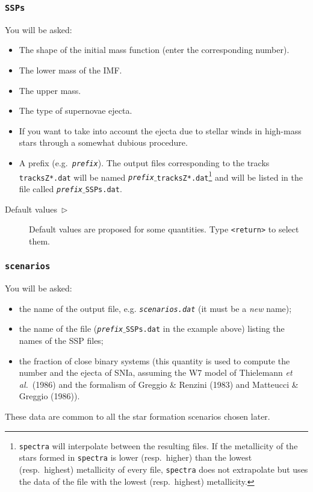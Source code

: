 \documentclass[11pt,draft,fleqn]{article}
\begin{document}
\subsubsection{\texttt{SSPs}}
You will be asked: 
\begin{itemize}
\item The shape of the initial mass function (enter the corresponding number).
\item The lower mass of the IMF.
\item The upper mass.
\item The type of supernovae ejecta.
\item If you want to take into account the ejecta due to stellar winds
in high-mass stars through a somewhat dubious procedure.
\item A prefix (e.g.\ \texttt{\emph{prefix}}). The output files corresponding
to the tracks \texttt{tracksZ*.dat} will be named 
\texttt{\emph{prefix}$\_$tracksZ*.dat}\footnote{\texttt{spectra} will 
interpolate between the 
resulting files. If the metallicity of the stars formed in \texttt{spectra} is 
lower (resp.\ higher) than the lowest (resp.\ highest) metallicity of every
file, \texttt{spectra} does not extrapolate but uses the data
of the file with the lowest (resp.\ highest) metallicity.} and will be
listed in the file called 
\texttt{\emph{prefix}$\_$SSPs.dat}.  
\end{itemize}
\begin{description}
\item[Default values~$\triangleright$]Default values are proposed for some quantities. Type \texttt{<return>}
to select them.
\end{description}
\subsubsection{\texttt{scenarios}}
You will be asked:
\begin{itemize}
\item the name of the output file, e.g. \texttt{\emph{scenarios.dat}} (it must be a \emph{new} name);
\item the name of the file (\texttt{\emph{prefix}$\_$SSPs.dat} in the example
above) listing the names of the SSP files;
\item the fraction of close binary systems (this quantity is used to compute the 
number and the ejecta of SNIa, assuming the W7 model of Thielemann \emph{et al.}\ 
(1986) and the formalism of Greggio \& Renzini (1983) and Matteucci \& Greggio 
(1986)). 
\end{itemize}
These data are common to all the star formation scenarios chosen
later. 
\end{document}
